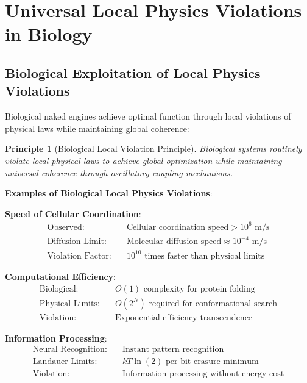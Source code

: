 \documentclass[12pt,a4paper]{article}
\newtheorem{principle}[theorem]{Principle}
\begin{document}
\section{Universal Local Physics Violations in Biology}

\subsection{Biological Exploitation of Local Physics Violations}

Biological naked engines achieve optimal function through local violations of physical laws while maintaining global coherence:

\begin{principle}[Biological Local Violation Principle]
Biological systems routinely violate local physical laws to achieve global optimization while maintaining universal coherence through oscillatory coupling mechanisms.
\end{principle}

\textbf{Examples of Biological Local Physics Violations}:

\textbf{Speed of Cellular Coordination}:
\begin{align}
\text{Observed}: \quad &\text{Cellular coordination speed} > 10^6 \text{ m/s} \\
\text{Diffusion Limit}: \quad &\text{Molecular diffusion speed} \approx 10^{-4} \text{ m/s} \\
\text{Violation Factor}: \quad &10^{10} \text{ times faster than physical limits}
\end{align}

\textbf{Computational Efficiency}:
\begin{align}
\text{Biological}: \quad &O(1) \text{ complexity for protein folding} \\
\text{Physical Limits}: \quad &O(2^N) \text{ required for conformational search} \\
\text{Violation}: \quad &\text{Exponential efficiency transcendence}
\end{align}

\textbf{Information Processing}:
\begin{align}
\text{Neural Recognition}: \quad &\text{Instant pattern recognition} \\
\text{Landauer Limits}: \quad &kT \ln(2) \text{ per bit erasure minimum} \\
\text{Violation}: \quad &\text{Information processing without energy cost}
\end{align}
\end{document}

